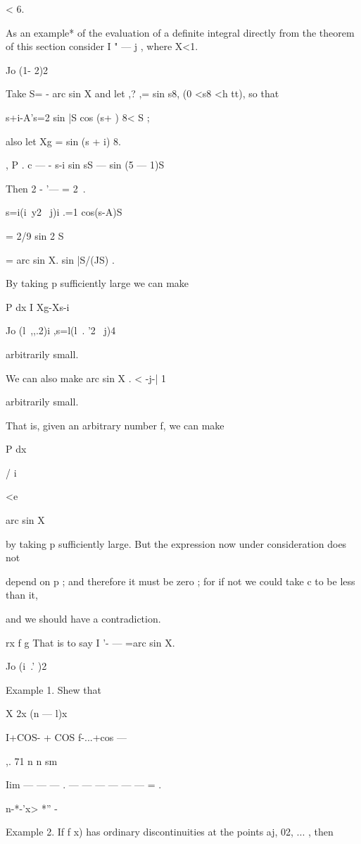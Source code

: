 < 6.

As an example* of the evaluation of a definite integral directly from
the theorem of this section consider I " — j , where X<1.

Jo (1- 2)2

Take S= - arc sin X and let ,? ,= sin s8, (0 <s8 <h tt), so that

 s+i-A's=2 sin |S cos (s+ ) 8< S ;

also let Xg = sin (s + i) 8.

 , P . c — - s-i sin sS — sin (5 — 1)S

Then 2 - '— = 2 \,.

s=i(i\ y2 \ j)i .=1 cos(s-A)S

= 2/9 sin 2 S

= arc sin X. sin |S/(JS) .

By taking p sufficiently large we can make



P dx I Xg-Xs-i

Jo (l\ ,,.2)i ,s=l(l\ . '2 \ j)4



arbitrarily small.

We can also make arc sin X . < -j-| 1

arbitrarily small.

That is, given an arbitrary number f, we can make



P dx

/ i~



<e



arc sin X

by taking p sufficiently large. But the expression now under
consideration does not

depend on p ; and therefore it must be zero ; for if not we could take
c to be less than it,

and we should have a contradiction.

rx f g That is to say I '- — =arc sin X.

Jo (i\ .' )2

Example 1. Shew that

X 2x (n — l)x

I+COS- + COS f-...+cos —

,. 71 n n sm

Iim — — — . — — — — — — = .

n-*-'x> *'' -

Example 2. If f x) has ordinary discontinuities at the points aj, 02,
... , then

